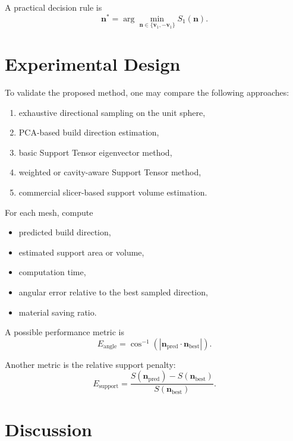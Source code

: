 \documentclass[11pt,a4paper]{article}
\begin{document}
A practical decision rule is
\begin{equation}
\bm n^\ast
=
\arg\min_{\bm n\in\{\bm v_1,-\bm v_1\}}
S_1(\bm n).
\end{equation}

\section{Experimental Design}

To validate the proposed method, one may compare the following approaches:

\begin{enumerate}
\item exhaustive directional sampling on the unit sphere,
\item PCA-based build direction estimation,
\item basic Support Tensor eigenvector method,
\item weighted or cavity-aware Support Tensor method,
\item commercial slicer-based support volume estimation.
\end{enumerate}

For each mesh, compute

\begin{itemize}
\item predicted build direction,
\item estimated support area or volume,
\item computation time,
\item angular error relative to the best sampled direction,
\item material saving ratio.
\end{itemize}

A possible performance metric is
\begin{equation}
E_{\text{angle}}
=
\cos^{-1}
\left(
|\bm n_{\text{pred}}\cdot \bm n_{\text{best}}|
\right).
\end{equation}

Another metric is the relative support penalty:
\begin{equation}
E_{\text{support}}
=
\frac{
S(\bm n_{\text{pred}})-S(\bm n_{\text{best}})
}{
S(\bm n_{\text{best}})
}.
\end{equation}

\section{Discussion}
\end{document}
